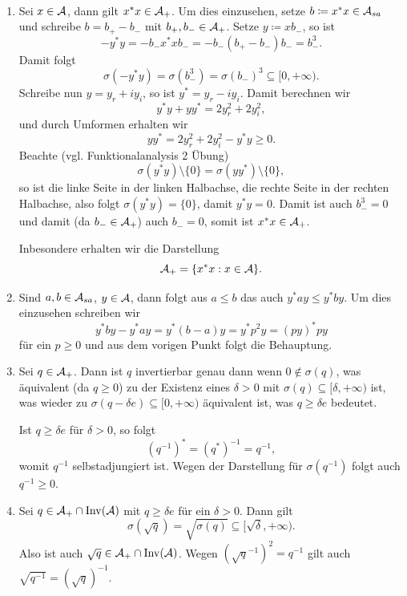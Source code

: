 \begin{remark}{\ }
\begin{enumerate}
        \item Sei $x \in \mathcal{A}$, dann gilt $x^* x \in \mathcal{A}_+$. Um dies einzusehen, setze $b \coloneqq x^* x \in \mathcal{A}_{sa}$ und schreibe $b = b_+ - b_-$ mit $b_+, b_- \in \mathcal{A}_+$. Setze $y \coloneqq x b_-$, so ist
        $$ -y^* y = -b_- x^* x b_- = -b_- (b_+ - b_-) b_- = b_-^3. $$
        Damit folgt
        $$ \sigma(-y^* y) = \sigma(b_-^3) = \sigma(b_-)^3 \subseteq [0, +\infty). $$
        Schreibe nun $y = y_r + i y_i$, so ist $y^* = y_r - i y_i$. Damit berechnen wir
        $$ y^* y + y y^* = 2y_r^2 + 2y_i^2, $$
        und durch Umformen erhalten wir
        $$ y y^* = 2y_r^2 + 2y_i^2 - y^* y \geq 0. $$
        Beachte (vgl. Funktionalanalysis 2 Übung)
        $$ \sigma(y^* y) \setminus \{ 0 \} = \sigma(y y^*) \setminus \{ 0 \}, $$
        so ist die linke Seite in der linken Halbachse, die rechte Seite in der rechten Halbachse, also folgt $\sigma(y^* y) = \{ 0 \}$, damit $y^* y = 0$. Damit ist auch $b_-^3 = 0$ und damit (da $b_- \in \mathcal{A}_+$) auch $b_- = 0$, somit ist $x^* x \in \mathcal{A}_+$.

        Inbesondere erhalten wir die Darstellung
        $$ \mathcal{A}_+ = \{ x^* x : x \in \mathcal{A} \}. $$

        \item Sind $a, b \in \mathcal{A}_{sa}$, $y \in \mathcal{A}$, dann folgt aus $a \leq b$ das auch $y^* a y \leq y^* b y$. Um dies einzusehen schreiben wir
        $$ y^* b y - y^* a y = y^* (b-a) y = y^* p^2 y = (py)^* py $$
        für ein $p \geq 0$ und aus dem vorigen Punkt folgt die Behauptung.

        \item Sei $q \in \mathcal{A}_+$. Dann ist $q$ invertierbar genau dann wenn $0 \notin \sigma(q)$, was äquivalent (da $q \geq 0$) zu der Existenz eines $\delta > 0$ mit $\sigma(q) \subseteq [\delta, +\infty)$ ist, was wieder zu $\sigma(q - \delta e) \subseteq [0, +\infty)$ äquivalent ist, was $q \geq \delta e$ bedeutet.
        
        Ist $q \geq \delta e$ für $\delta > 0$, so folgt
        $$ (q^{-1})^* = (q^*)^{-1} = q^{-1}, $$
        womit $q^{-1}$ selbstadjungiert ist. Wegen der Darstellung für $\sigma(q^{-1})$ folgt auch $q^{-1} \geq 0$.

        \item Sei $q \in \mathcal{A}_+ \cap \operatorname*{Inv}(\mathcal{A})$ mit $q \geq \delta e$ für ein $\delta > 0$. Dann gilt
        $$ \sigma(\sqrt{q}) = \sqrt{\sigma(q)} \subseteq [\sqrt{\delta}, +\infty). $$
        Also ist auch $\sqrt{q} \in \mathcal{A}_+ \cap \operatorname*{Inv}(\mathcal{A})$. Wegen $(\sqrt{q}^{-1})^2 = q^{-1}$ gilt auch $\sqrt{q^{-1}} = (\sqrt{q})^{-1}$.


\end{enumerate}
\end{remark}
